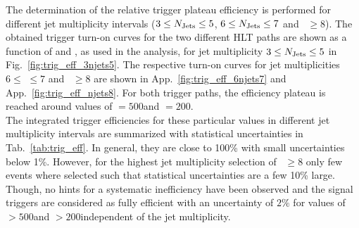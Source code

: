 The determination of the relative trigger plateau efficiency is performed for different jet multiplicity intervals ($3 \leq N_{\text{Jets}} \leq 5$, $6 \leq N_{\text{Jets}} \leq 7$ and \NJets~$ \ge 8$). The obtained trigger turn-on curves for the two different HLT paths are shown as a function of \HT and \MHT, as used in the analysis, for jet multiplicity $3 \leq N_{\text{Jets}} \leq 5$ in Fig.~\ref{fig:trig_eff_3njets5}. The respective turn-on curves for jet multiplicities $6 \leq$ \NJets $\leq 7$ and \NJets~$ \ge 8$ are shown in App.~\ref{fig:trig_eff_6njets7} and App.~\ref{fig:trig_eff_njets8}. For both trigger paths, the efficiency plateau is reached around values of \HT$ = 500$\gev and \MHT$ = 200$\gev. \\
The integrated trigger efficiencies for these particular values in different jet multiplicity intervals are summarized with statistical uncertainties in Tab.~\ref{tab:trig_eff}. In general, they are close to 100\% with small uncertainties below 1\%. However, for the highest jet multiplicity selection of \NJets~$ \ge 8$ only few events where selected such that statistical uncertainties are a few 10\% large. Though, no hints for a systematic inefficiency have been observed and the signal triggers are considered as fully efficient with an uncertainty of $2\%$ for values of \HT$ > 500$\gev and \MHT$ > 200$\gev independent of the jet multiplicity. 

